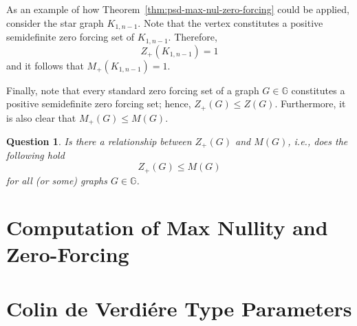 \documentclass{article}
\newtheorem{question}[theorem]{Question}
\theoremstyle{definition}
\begin{document}
As an example of how Theorem~\ref{thm:psd-max-nul-zero-forcing} could be applied, consider the star graph $K_{1,n-1}$. 
Note that the  vertex constitutes a positive semidefinite zero forcing set of $K_{1,n-1}$.
Therefore, 
\[
Z_{+}(K_{1,n-1}) = 1
\]
and it follows that $M_{+}(K_{1,n-1}) = 1$.

Finally, note that every standard zero forcing set of a graph $G\in\mathbb{G}$ constitutes a positive semidefinite zero forcing set; hence, $Z_{+}(G)\leq Z(G)$.
Furthermore, it is also clear that $M_{+}(G)\leq M(G)$.
\begin{question}
Is there a relationship between $Z_{+}(G)$ and $M(G)$, i.e., does the following hold
\[
Z_{+}(G) \leq M(G)
\]
for all (or some) graphs $G\in\mathbb{G}$.
\end{question}

\section{Computation of Max Nullity and Zero-Forcing}
\section{Colin de Verdi{\'e}re Type Parameters}
\label{Bibliography}


\end{document}
